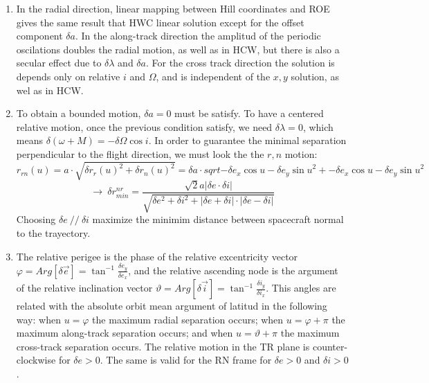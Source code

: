 \documentclass[a4paper]{article}
\begin{document}
\begin{enumerate}[label=\emph{\alph*)}]
  \item %
    In the radial direction, linear mapping between Hill coordinates and ROE gives the same result that HWC linear solution except for the offset component $\delta a$. In the along-track direction the amplitud of the periodic oscilations doubles the radial motion, as well as in HCW, but there is also a secular effect due to $\delta\lambda$ and $\delta a$. For the cross track direction the solution is depends only on relative $i$ and $\Omega$, and is independent of the $x,y$ solution, as wel as in HCW.

  \item %
    To obtain a bounded motion, $\delta a=0$ must be satisfy. To have a centered relative motion, once the previous condition satisfy, we need $\delta \lambda = 0$, which means $\delta(\omega+M)=-\delta\Omega\cos{i}$. In order to guarantee the minimal separation perpendicular to the flight direction, we must look the the $r,n$ motion:
    \[ r_{rn}(u) = a\cdot \sqrt{{\delta r_r(u)}^2+{\delta r_n(u)}^2} = \delta a\cdot sqrt{{-\delta e_x\cos{u}-\delta e_y\sin{u}}^2+{-\delta e_x\cos{u}-\delta e_y\sin{u}}^2} \]
    \[\rightarrow ~\delta r_{min}^{nr} = \frac{\sqrt{2}a|\delta e \cdot \delta i|}{\sqrt{\delta e^2+\delta i^2+|\delta e + \delta i| \cdot |\delta e - \delta i|}} \]
  Choosing $\delta e~//~\delta i$ maximize the minimim distance between spacecraft normal to the trayectory.

  \item %
    The relative perigee is the phase of the relative excentricity vector $\varphi = Arg[\delta \vec{e}] = \tan^{-1}{\frac{\delta e_y}{\delta e_x}}$, and the relative ascending node is the argument of the relative inclination vector $\vartheta = Arg[\delta \vec{i}]= \tan^{-1}{\frac{\delta i_y}{\delta i_x}}$. This angles are related with the absolute orbit mean argument of latitud in the following way: when $u = \varphi$ the maximum radial separation occurs; when $u = \varphi+\pi$ the maximum along-track separation occurs; and when $u = \vartheta+\pi$ the maximum cross-track separation occurs. The relative motion in the TR plane is counter-clockwise for $\delta e > 0 $. The same is valid for the RN frame for $\delta e > 0$ and $\delta i > 0$.


\end{enumerate}
\end{document}
